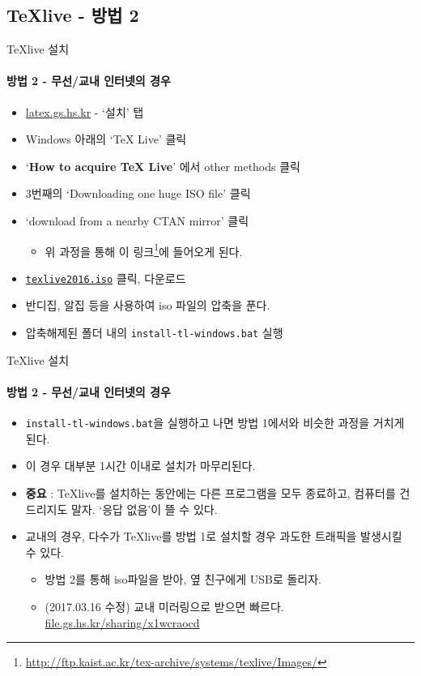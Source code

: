 \documentclass[12pt]{beamer}
\begin{document}
\subsection{TeXlive - 방법 2}
\begin{frame}{TeXlive 설치}
	\framesubtitle{방법 2 - 무선/교내 인터넷의 경우}
	\small
	\begin{itemize}
		\item \url{latex.gs.hs.kr} - `설치' 탭
		\item Windows 아래의 `TeX Live' 클릭
		\item `\textbf{How to acquire TeX Live}' 에서 other methods 클릭
		\item 3번째의 `Downloading one huge ISO file' 클릭
		\item `download from a nearby CTAN mirror' 클릭
		\begin{itemize}
			\item 위 과정을 통해 이 링크\footnote{\url{http://ftp.kaist.ac.kr/tex-archive/systems/texlive/Images/}}에 들어오게 된다.
		\end{itemize}
		\item \texttt{\underline{texlive2016.iso}} 클릭, 다운로드
		\item 반디집, 알집 등을 사용하여 iso 파일의 압축을 푼다.
		\item 압축해제된 폴더 내의 \texttt{install-tl-windows.bat} 실행
	\end{itemize}
\end{frame}
\begin{frame}{TeXlive 설치}
	\framesubtitle{방법 2 - 무선/교내 인터넷의 경우}
	\begin{itemize}
		\item \texttt{install-tl-windows.bat}을 실행하고 나면 방법 1에서와 비슷한 과정을 거치게 된다.
		\item 이 경우 대부분 1시간 이내로 설치가 마무리된다.
		\item \textbf{중요} : TeXlive를 설치하는 동안에는 다른 프로그램을 모두 종료하고, 컴퓨터를 건드리지도 말자. `응답 없음'이 뜰 수 있다.
		\item 교내의 경우, 다수가 TeXlive를 방법 1로 설치할 경우 과도한 트래픽을 발생시킬 수 있다.
		\begin{itemize}
			\item 방법 2를 통해 iso파일을 받아, 옆 친구에게 USB로 돌리자.
			\item (2017.03.16 수정) 교내 미러링으로 받으면 빠르다. \\
			\url{file.gs.hs.kr/sharing/x1wcraocd}
		\end{itemize}
	\end{itemize}
\end{frame}
\end{document}
